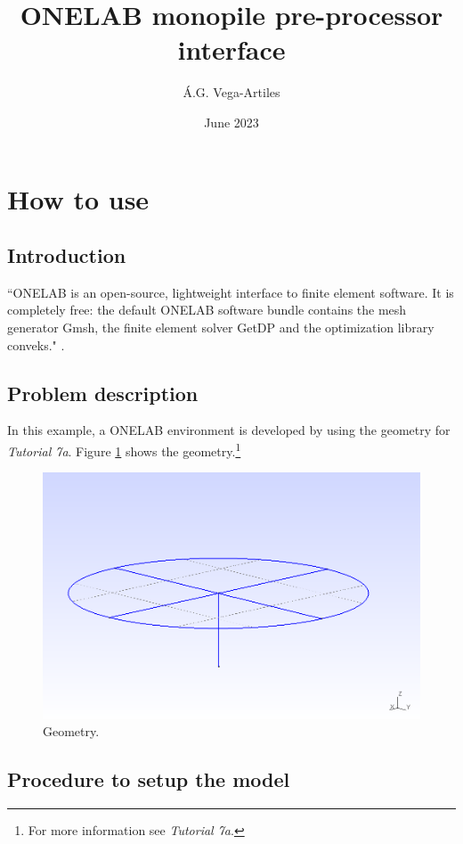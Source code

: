 \documentclass[a4]{article}
\title{ONELAB monopile pre-processor interface}
\author{\'A.G. Vega-Artiles}
\date{June 2023}
\begin{document}
\maketitle

\tableofcontents

\section{How to use}

\subsection{Introduction}

``ONELAB is an open-source, lightweight interface to finite element software. It is completely free: the default ONELAB software bundle contains the mesh generator Gmsh, the finite element solver GetDP and the optimization library conveks." \cite{onelabweb}.

\subsection{Problem description}

In this example, a ONELAB environment is developed by using the geometry for \textit{Tutorial 7a}. Figure \ref{fig:geometry} shows the geometry.\footnote{For more information see \textit{Tutorial 7a}.}

\begin{figure}[tbh!]
	\centering
	\includegraphics[scale=0.6]{geometry.png}
	\caption{Geometry.}
	\label{fig:geometry}
\end{figure}

\subsection{Procedure to setup the model}
\end{document}
